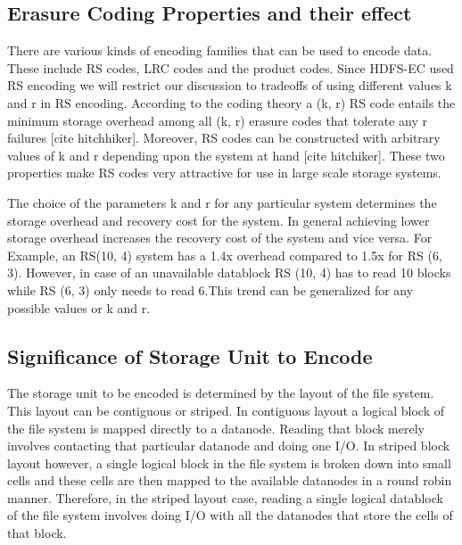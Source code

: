 \documentclass{sig-alternate-05-2015}
\begin{document}
\subsection{Erasure Coding Properties and their effect}

There are various kinds of encoding families that can be used to encode data. These include RS codes, LRC codes and the product codes. Since HDFS-EC used RS encoding we will restrict our discussion to tradeoffs of using different values k and r in RS encoding. According to the coding theory a (k, r) RS code entails the minimum storage overhead among all (k, r) erasure codes that tolerate any r failures [cite hitchhiker]. Moreover, RS codes can be constructed with arbitrary values of k and r depending upon the system at hand [cite hitchiker]. These two properties make RS codes very attractive for use in large scale storage systems. 


The choice of the parameters k and r for any particular system determines the storage overhead and recovery cost for the system. In general achieving lower storage overhead increases the recovery cost of the system and vice versa. For Example, an RS(10, 4) system has a 1.4x overhead compared to 1.5x for RS (6, 3). However, in case of an unavailable datablock RS (10, 4) has to read 10 blocks while RS (6, 3) only needs to read 6.This trend can be generalized for any possible values or k and r. 



\subsection{Significance of Storage Unit to Encode}

The storage unit to be encoded is determined by the layout of the file system. This layout can be contiguous or striped. In contiguous layout a logical block of the file system is mapped directly to a datanode. Reading that block merely involves contacting that particular datanode and doing one I/O.  In striped block layout however, a single logical block in the file system is broken down into small cells and these cells are then mapped to the available datanodes in a round robin manner. Therefore, in the striped layout case, reading a single logical datablock of the file system involves doing I/O with all the datanodes that store the cells of that block. 

\end{document}
